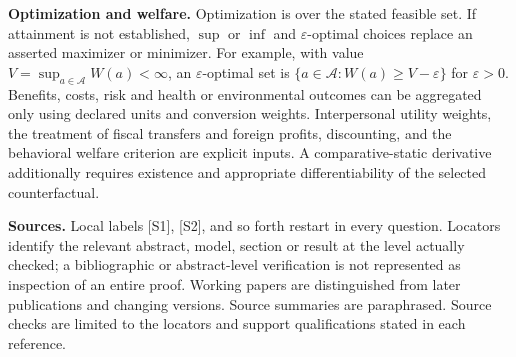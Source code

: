 \documentclass[11pt,a4paper]{article}
\begin{document}
\textbf{Optimization and welfare.} Optimization is over the stated feasible set. If attainment is not established, $\sup$ or $\inf$ and $\varepsilon$-optimal choices replace an asserted maximizer or minimizer. For example, with value $V=\sup_{a\in\mathcal A}W(a)<\infty$, an $\varepsilon$-optimal set is $\{a\in\mathcal A:W(a)\geq V-\varepsilon\}$ for $\varepsilon>0$. Benefits, costs, risk and health or environmental outcomes can be aggregated only using declared units and conversion weights. Interpersonal utility weights, the treatment of fiscal transfers and foreign profits, discounting, and the behavioral welfare criterion are explicit inputs. A comparative-static derivative additionally requires existence and appropriate differentiability of the selected counterfactual.

\textbf{Sources.} Local labels [S1], [S2], and so forth restart in every question. Locators identify the relevant abstract, model, section or result at the level actually checked; a bibliographic or abstract-level verification is not represented as inspection of an entire proof. Working papers are distinguished from later publications and changing versions. Source summaries are paraphrased. Source checks are limited to the locators and support qualifications stated in each reference.
\end{document}
